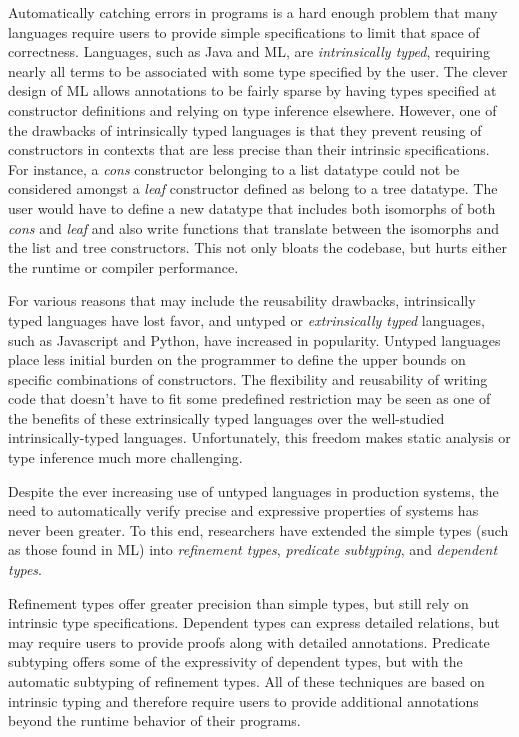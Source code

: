 \documentclass[acmsmall]{acmart}
\theoremstyle{definition}
\begin{document}
Automatically catching errors in programs is a hard enough problem
that many languages require users to provide simple specifications to limit that space of correctness.
Languages, such as Java and ML, are \textit{intrinsically typed}, 
requiring nearly all terms to be associated with some type specified by the user. 
The clever design of ML allows annotations to be fairly sparse by 
having types specified at constructor definitions and relying on type inference elsewhere.
However, one of the drawbacks of intrinsically typed languages is that they prevent reusing of
constructors in contexts that are less precise than their intrinsic specifications. For instance,
a \emph{cons} constructor belonging to a list datatype could not be considered amongst a \emph{leaf} constructor
defined as belong to a tree datatype. The user would have to define a new datatype that includes both isomorphs of both \emph{cons}
and \emph{leaf} and also write functions that translate between the isomorphs and the list and tree constructors. 
This not only bloats the codebase, but hurts either the runtime or compiler performance.

For various reasons that may include the reusability drawbacks, intrinsically typed languages have lost favor,
and untyped or \textit{extrinsically typed} languages, 
such as Javascript and Python, have increased in popularity. 
Untyped languages place less initial burden on the programmer to define the upper bounds
on specific combinations of constructors.
The flexibility and reusability of writing code that doesn't have to fit some predefined restriction 
may be seen as one of the benefits of these extrinsically typed languages over the well-studied intrinsically-typed languages.
Unfortunately, this freedom makes static analysis or type inference much more challenging. 

Despite the ever increasing use of untyped languages in production systems, 
the need to automatically verify precise and expressive properties of systems has never been greater.
To this end, researchers have extended the simple types (such as those found in ML) into 
\textit{refinement types}, \textit{predicate subtyping}, and \textit{dependent types}. 

Refinement types offer greater precision than simple types, but still rely on intrinsic type specifications.
Dependent types can express detailed relations, but may require users to provide proofs along with detailed annotations.
Predicate subtyping offers some of the expressivity of dependent types, but with the automatic subtyping of refinement types.
All of these techniques are based on intrinsic typing and therefore require users to provide additional annotations
beyond the runtime behavior of their programs.
\end{document}
